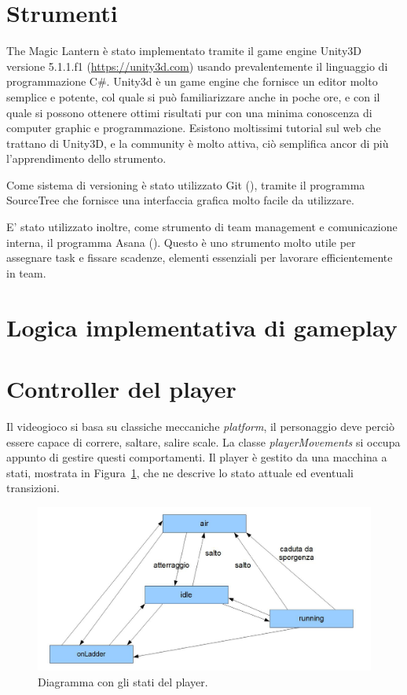 \section{Strumenti}
\label{sec:dev_strumenti}

The Magic Lantern è stato implementato tramite il game engine Unity3D versione 5.1.1.f1 (\url{https://unity3d.com}) usando prevalentemente il linguaggio di programmazione C\#. Unity3d è un game engine che fornisce un editor molto semplice e potente, col quale si può familiarizzare anche in poche ore, e con il quale si possono ottenere ottimi risultati pur con una minima conoscenza di computer graphic e programmazione. Esistono moltissimi tutorial sul web che trattano di Unity3D, e la community è molto attiva, ciò semplifica ancor di più l'apprendimento dello strumento.

Come sistema di versioning è stato utilizzato Git (\cite{github}), tramite il programma SourceTree che fornisce una interfaccia grafica molto facile da utilizzare.

E' stato utilizzato inoltre, come strumento di team management e comunicazione interna, il programma Asana (\cite{asana}). Questo è uno strumento molto utile per assegnare task e fissare scadenze, elementi essenziali per lavorare efficientemente in team.


\section{Logica implementativa di gameplay}

\section{Controller del player}
\label{sec:player_movements}

Il videogioco si basa su classiche meccaniche \textit{platform}, il personaggio deve perciò essere capace di correre, saltare, salire scale. La classe \textit{playerMovements} si occupa appunto di gestire questi comportamenti.
Il player è gestito da una macchina a stati, mostrata in Figura~\ref{fig:development_player_stati}, che ne descrive lo stato attuale ed eventuali transizioni.

\begin{figure}%
	\centering
	\includegraphics[width= 0.9\columnwidth]{images/development/player.jpg}
	\caption{Diagramma con gli stati del player.}
	\label{fig:development_player_stati}
\end{figure}

